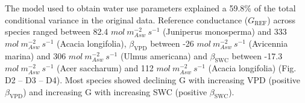 \documentclass[11pt,twoside]{reedthesis}
\begin{document}
The model used to obtain water use parameters explained a 59.8\% of the
total conditional variance in the original data. Reference conductance
(\(G_{\text{REF}}\)) across species ranged between 82.4
\(mol\: m_{Asw}^{-2}\: s^{-1}\) (Juniperus monosperma) and 333
\(mol\: m_{Asw}^{-2}\: s^{-1}\) (Acacia longifolia),
\(\beta_{\text{VPD}}\) between -26 \(mol\: m_{Asw}^{-2}\: s^{-1}\)
(Avicennia marina) and 306 \(mol\: m_{Asw}^{-2}\: s^{-1}\) (Ulmus
americana) and \(\beta_{\text{SWC}}\) between -17.3
\(mol\: m_{Asw}^{-2}\: s^{-1}\) (Acer saccharum) and 112
\(mol \: m_{Asw}^{-2}\: s^{-1}\) (Acacia longifolia) (Fig. D2 -- D3 --
D4). Most species showed declining G with increasing VPD (positive
\(\beta_{\text{VPD}}\)) and increasing G with increasing SWC (positive
\(\beta_{\text{SWC}}\)).\par
\end{document}
